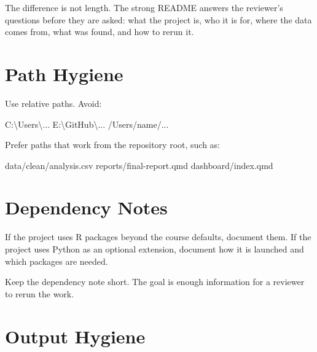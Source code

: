 \documentclass[
  letterpaper,
  DIV=11,
  numbers=noendperiod,
  oneside]{scrreprt}
\newenvironment{Shaded}{\begin{snugshade}}{\end{snugshade}}
\newcommand{\NormalTok}[1]{\textcolor[rgb]{0.00,0.23,0.31}{#1}}
\begin{document}
The difference is not length. The strong README answers the reviewer's
questions before they are asked: what the project is, who it is for,
where the data comes from, what was found, and how to rerun it.

\section*{Path Hygiene}\label{path-hygiene}


Use relative paths. Avoid:

\begin{Shaded}
\begin{Highlighting}[numbers=left,,]
\NormalTok{C:\textbackslash{}Users\textbackslash{}...}
\NormalTok{E:\textbackslash{}GitHub\textbackslash{}...}
\NormalTok{/Users/name/...}
\end{Highlighting}
\end{Shaded}

Prefer paths that work from the repository root, such as:

\begin{Shaded}
\begin{Highlighting}[numbers=left,,]
\NormalTok{data/clean/analysis.csv}
\NormalTok{reports/final{-}report.qmd}
\NormalTok{dashboard/index.qmd}
\end{Highlighting}
\end{Shaded}

\section*{Dependency Notes}\label{dependency-notes}


If the project uses R packages beyond the course defaults, document
them. If the project uses Python as an optional extension, document how
it is launched and which packages are needed.

Keep the dependency note short. The goal is enough information for a
reviewer to rerun the work.

\section*{Output Hygiene}\label{output-hygiene}
\end{document}
